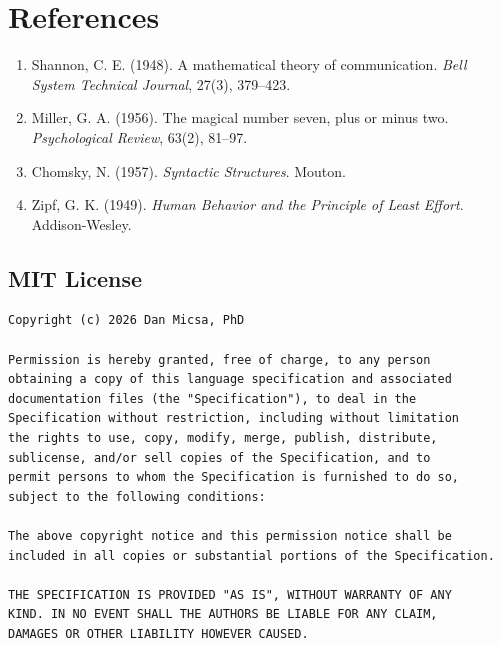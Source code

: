 \documentclass[12pt,onecolumn,letterpaper]{article}
\begin{document}
\section*{References}
\begin{enumerate}
\item Shannon, C. E. (1948). A mathematical theory of communication. \textit{Bell System Technical Journal}, 27(3), 379--423.
\item Miller, G. A. (1956). The magical number seven, plus or minus two. \textit{Psychological Review}, 63(2), 81--97.
\item Chomsky, N. (1957). \textit{Syntactic Structures}. Mouton.
\item Zipf, G. K. (1949). \textit{Human Behavior and the Principle of Least Effort}. Addison-Wesley.
\end{enumerate}

\begin{appendices}

\section*{MIT License}

\begin{lstlisting}
Copyright (c) 2026 Dan Micsa, PhD

Permission is hereby granted, free of charge, to any person
obtaining a copy of this language specification and associated
documentation files (the "Specification"), to deal in the
Specification without restriction, including without limitation
the rights to use, copy, modify, merge, publish, distribute,
sublicense, and/or sell copies of the Specification, and to
permit persons to whom the Specification is furnished to do so,
subject to the following conditions:

The above copyright notice and this permission notice shall be
included in all copies or substantial portions of the Specification.

THE SPECIFICATION IS PROVIDED "AS IS", WITHOUT WARRANTY OF ANY
KIND. IN NO EVENT SHALL THE AUTHORS BE LIABLE FOR ANY CLAIM,
DAMAGES OR OTHER LIABILITY HOWEVER CAUSED.
\end{lstlisting}

\end{appendices}
\end{document}
